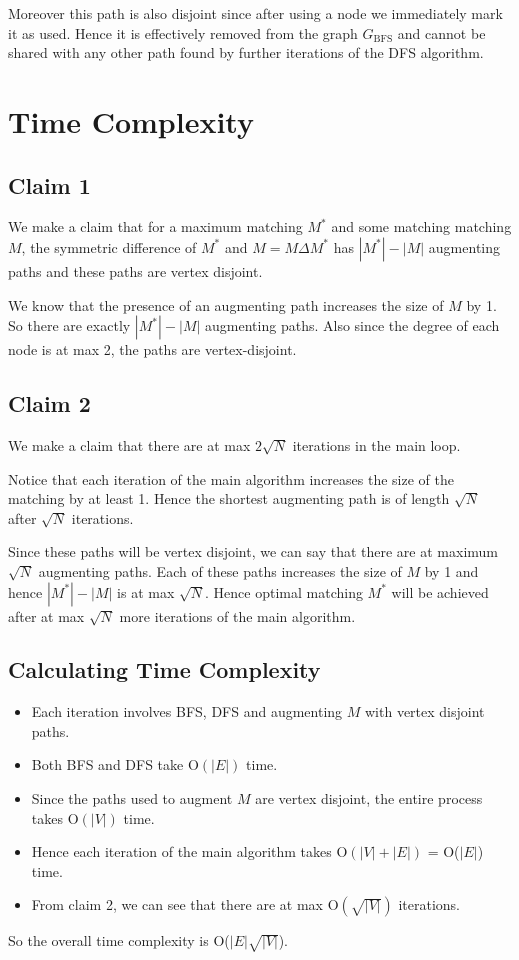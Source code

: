 Moreover this path is also disjoint since after using a node we immediately mark it as used. Hence it is effectively removed from the graph $G_{\mathrm{BFS}}$ and cannot be shared with any other path found by further iterations of the DFS algorithm.

\section{Time Complexity}

\subsection{Claim 1}
We make a claim that for a maximum matching $M^*$ and some matching matching $M$, the symmetric difference of $M^*$ and $M = M \Delta M^*$ has $|M^*|-|M|$ augmenting paths and these paths are vertex disjoint. 

We know that the presence of an augmenting path increases the size of $M$ by 1. So there are exactly $|M^*|-|M|$ augmenting paths. Also since the degree of each node is at max 2, the paths are vertex-disjoint.

\subsection{Claim 2}
We make a claim that there are at max $2\sqrt{N}$ iterations in the main loop. 

Notice that each iteration of the main algorithm increases the size of the matching by at least 1. Hence the shortest augmenting path is of length $\sqrt{N}$ after $\sqrt{N}$ iterations.

Since these paths will be vertex disjoint, we can say that there are at maximum $\sqrt{N}$ augmenting paths. Each of these paths increases the size of $M$ by 1 and hence $|M^*|-|M|$ is at max $\sqrt{N}$. Hence optimal matching $M^*$ will be achieved after at max $\sqrt{N}$ more iterations of the main algorithm.

\subsection{Calculating Time Complexity}
\begin{itemize}
    \item Each iteration involves BFS, DFS and augmenting $M$ with vertex disjoint paths.
    \item Both BFS and DFS take O$(|E|)$ time.
    \item Since the paths used to augment $M$ are vertex disjoint, the entire process takes O$(|V|)$ time.
    \item Hence each iteration of the main algorithm takes O$(|V|+|E|)$ = O($|E|$) time.
    \item From claim 2, we can see that there are at max O$(\sqrt{|V|})$ iterations.
\end{itemize}
So the overall time complexity is O($|E|\sqrt{|V|}$).

